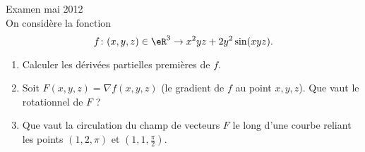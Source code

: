 
\begin{exercice}\label{exoDerive-0008} Examen mai 2012\\

    On considère la fonction
    \begin{equation}
        f\colon (x,y,z)\in \eR^3\to x^2yz+2y^2\sin(xyz).
    \end{equation}
    \begin{enumerate}
        \item
            Calculer les dérivées partielles premières de \( f\).
        \item
            Soit \( F(x,y,z)=\nabla f(x,y,z)\) (le gradient de \( f\) au point \( x,y,z\)). Que vaut le rotationnel de \( F\) ?
        \item
            Que vaut la circulation du champ de vecteurs \( F\) le long d'une courbe reliant les points \( (1,2,\pi)\) et \( (1,1,\frac{ \pi }{2})\).
    \end{enumerate}

\end{exercice}
